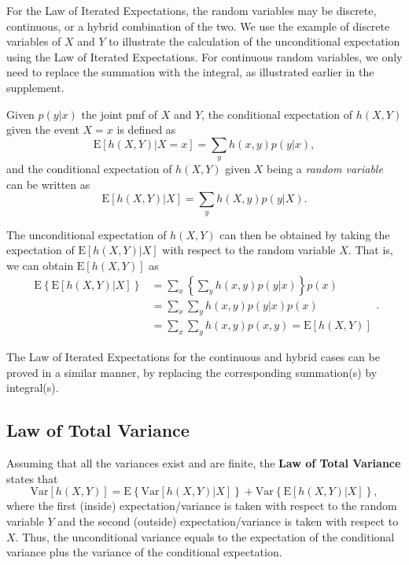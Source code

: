 \documentclass[]{book}
\theoremstyle{definition}
\theoremstyle{definition}
\theoremstyle{definition}
\theoremstyle{remark}
\begin{document}
For the Law of Iterated Expectations, the random variables may be
discrete, continuous, or a hybrid combination of the two. We use the
example of discrete variables of \(X\) and \(Y\) to illustrate the
calculation of the unconditional expectation using the Law of Iterated
Expectations. For continuous random variables, we only need to replace
the summation with the integral, as illustrated earlier in the
supplement.

Given \(p(y|x)\) the joint pmf of \(X\) and \(Y\), the conditional
expectation of \(h(X,Y)\) given the event \(X=x\) is defined as
\[\mathrm{E} \left[ h(X,Y) | X=x \right] = \sum_y h(x,y) p(y|x),\] and
the conditional expectation of \(h(X,Y)\) given \(X\) being a
\emph{random variable} can be written as
\[\mathrm{E} \left[ h(X,Y) | X \right] = \sum_y h(X,y) p(y|X).\]

The unconditional expectation of \(h(X,Y)\) can then be obtained by
taking the expectation of \(\mathrm{E} \left[ h(X,Y) | X \right]\) with
respect to the random variable \(X\). That is, we can obtain
\(\mathrm{E}[ h(X,Y)]\) as \[\begin{aligned}
     \mathrm{E} \left\{ \mathrm{E} \left[ h(X,Y) | X \right] \right \}
    &= \sum_x  \left\{\sum_y h(x,y) p(y|x) \right \} p(x) \\
    &= \sum_x  \sum_y h(x,y) p(y|x)p(x) \\
    &=  \sum_x  \sum_y h(x,y) p(x,y)
    =  \mathrm{E}[h(X,Y)] \end{aligned}.\]

The Law of Iterated Expectations for the continuous and hybrid cases can
be proved in a similar manner, by replacing the corresponding
summation(s) by integral(s).

\subsection{Law of Total Variance}\label{law-of-total-variance}

Assuming that all the variances exist and are finite, the \textbf{Law of
Total Variance} states that
\[\mathrm{Var}[h(X,Y)]= \mathrm{E} \left\{ \mathrm{Var} \left[h(X,Y) | X \right] \right \}
    +\mathrm{Var} \left\{ \mathrm{E} \left[ h(X,Y) | X \right] \right \},\]
where the first (inside) expectation/variance is taken with respect to
the random variable \(Y\) and the second (outside) expectation/variance
is taken with respect to \(X\). Thus, the unconditional variance equals
to the expectation of the conditional variance plus the variance of the
conditional expectation.
\end{document}
